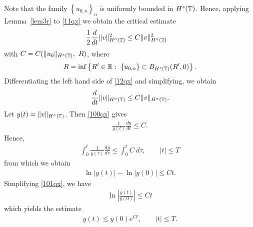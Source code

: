 Note that the family $\left\{ u_{0,n} \right\}_n$ is uniformly bounded in
$H^s(\mathbb{T})$. Hence, applying Lemma~\ref{lem3r} to \eqref{11qx} we obtain the critical estimate 
\begin{equation}
\begin{split}
\label{12qx}
\frac{1}{2}\frac{d}{dt} \|v\|_{H^{\sigma}(\mathbb{T})}^2
& \le
C \|v\|_{H^{\sigma}(\mathbb{T})}^2
\end{split}
\end{equation}
with $C = C(\|u_0\|_{H^s(\mathbb{T})}, \ R)$, where
\begin{equation}
\label{r-def}
R = \inf \left\{ R' \in \mathbb{R}:\ \{u_{0,n}\} \subset B_{H^s(\mathbb{T})}(R',0)
\right\}.
\end{equation}
Differentiating the left hand side of \eqref{12qx} and simplifying, we
obtain
\begin{equation}
\begin{split}
\frac{d}{dt}\|v\|_{H^{\sigma}(\mathbb{T})} \le C \|v\|_{H^{\sigma}(\mathbb{T})}.
\label{100qx}
\end{split}
\end{equation}
Let $y(t) = \|v\|_{H^{\sigma}(\mathbb{T})}$. Then \eqref{100qx} gives
\begin{equation*}
\begin{split}
\frac{1}{y(t)}\frac{dy}{dt} \le C.
\end{split}
\end{equation*}
Hence,
\begin{equation*}
\begin{split}
\int_0^t \frac{1}{y(\tau)} \frac{dy}{d \tau}
\le \int_0^t C \ d \tau, \qquad |t| \le T
\end{split}
\end{equation*}
from which we obtain
\begin{equation}
\begin{split}
\ln |y(t) | - \ln |y(0)| \le C t.
\label{101qx}
\end{split}
\end{equation}
Simplifying \eqref{101qx}, we have
\begin{equation*}
\begin{split}
\ln \left |\frac{y(t)}{y(0)} \right | \le C t
\end{split}
\end{equation*}
which yields the estimate
\begin{equation*}
\begin{split}
y(t) \le y(0) e^{C t}, \qquad |t| \le T.
\end{split}
\end{equation*}
